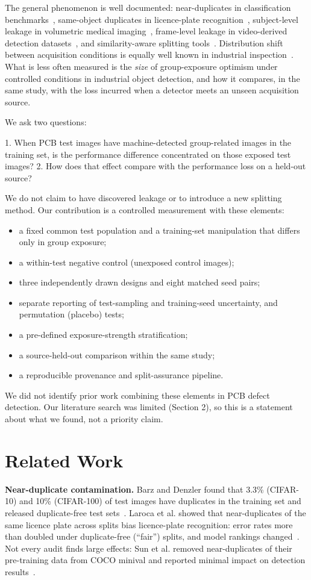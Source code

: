 \documentclass[11pt]{article}
\begin{document}
The general phenomenon is well documented: near-duplicates in classification benchmarks~\cite{barz2020}, same-object duplicates in licence-plate recognition~\cite{laroca2023}, subject-level leakage in volumetric medical imaging~\cite{tampu2022}, frame-level leakage in video-derived detection datasets~\cite{figueiredo2024}, and similarity-aware splitting tools~\cite{joeres2025datasail}. Distribution shift between acquisition conditions is equally well known in industrial inspection~\cite{zhang2023aebad,pemula2025robustad}. What is less often measured is the \emph{size} of group-exposure optimism under controlled conditions in industrial object detection, and how it compares, in the same study, with the loss incurred when a detector meets an unseen acquisition source.

We ask two questions:

1. When PCB test images have machine-detected group-related images in the training set, is the performance difference concentrated on those exposed test images? 2. How does that effect compare with the performance loss on a held-out source?

We do not claim to have discovered leakage or to introduce a new splitting method. Our contribution is a controlled measurement with these elements:

\begin{itemize}
\item a fixed common test population and a training-set manipulation that differs only in group exposure;
\item a within-test negative control (unexposed control images);
\item three independently drawn designs and eight matched seed pairs;
\item separate reporting of test-sampling and training-seed uncertainty, and permutation (placebo) tests;
\item a pre-defined exposure-strength stratification;
\item a source-held-out comparison within the same study;
\item a reproducible provenance and split-assurance pipeline.
\end{itemize}
We did not identify prior work combining these elements in PCB defect detection. Our literature search was limited (Section 2), so this is a statement about what we found, not a priority claim.

\section{Related Work}
\textbf{Near-duplicate contamination.} Barz and Denzler found that 3.3\% (CIFAR-10) and 10\% (CIFAR-100) of test images have duplicates in the training set and released duplicate-free test sets~\cite{barz2020}. Laroca et al. showed that near-duplicates of the same licence plate across splits bias licence-plate recognition: error rates more than doubled under duplicate-free (``fair'') splits, and model rankings changed~\cite{laroca2023}. Not every audit finds large effects: Sun et al. removed near-duplicates of their pre-training data from COCO minival and reported minimal impact on detection results~\cite{sun2017revisiting}.
\end{document}
